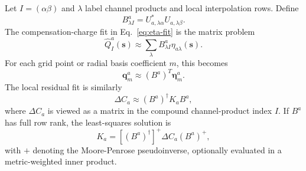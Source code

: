 \documentclass[aps,prb,reprint,superscriptaddress,longbibliography,nofootinbib]{revtex4-2}
\begin{document}
Let \(I=(\alpha\beta)\) and \(\lambda\) label channel products and local interpolation rows.  Define
\begin{equation}
B_{\lambda I}^{a}=U_{a,\lambda\alpha}^*U_{a,\lambda\beta}.
\label{eq:app-b-matrix}
\end{equation}
The compensation-charge fit in Eq.~\eqref{eq:eta-fit} is the matrix problem
\begin{equation}
\widehat Q_I^a(\mathbf s)
\approx
\sum_\lambda B_{\lambda I}^{a}\eta_{a\lambda}(\mathbf s).
\label{eq:app-qfit}
\end{equation}
For each grid point or radial basis coefficient \(m\), this becomes
\begin{equation}
\mathbf q_m^a\approx (B^a)^T\boldsymbol\eta_m^a.
\label{eq:app-qfit-matrix}
\end{equation}
The local residual fit is similarly
\begin{equation}
\Delta C_a\approx (B^a)^\dagger K_a B^a,
\label{eq:app-kfit-matrix}
\end{equation}
where \(\Delta C_a\) is viewed as a matrix in the compound channel-product index \(I\).  If \(B^a\) has full row rank, the least-squares solution is
\begin{equation}
K_a=
\left[(B^a)^\dagger\right]^+\Delta C_a (B^a)^+,
\label{eq:app-kfit-solution}
\end{equation}
with \(+\) denoting the Moore-Penrose pseudoinverse, optionally evaluated in a metric-weighted inner product.

%
%
%
\end{document}
